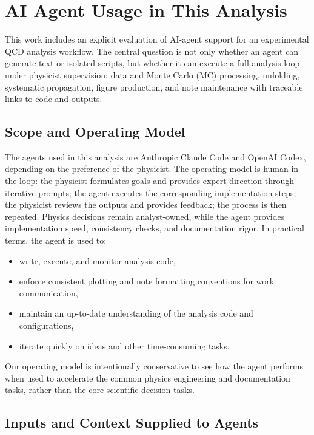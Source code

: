 \section{AI Agent Usage in This Analysis}
\label{sec:ai_agent}

This work includes an explicit evaluation of AI-agent support for an experimental QCD analysis workflow. The central question is not only whether an agent can generate text or isolated scripts, but whether it can execute a full
analysis loop under physicist supervision: data and Monte Carlo (MC) processing, unfolding, systematic propagation, figure production, and note maintenance with traceable links to code and outputs.

\subsection{Scope and Operating Model}

The agents used in this analysis are Anthropic Claude Code and OpenAI Codex, depending on the preference of the physicist. The operating model is human-in-the-loop: the physicist formulates goals and provides expert direction through iterative prompts; the agent executes the corresponding implementation steps; the physicist reviews the outputs and provides feedback; the process is then repeated. Physics decisions remain analyst-owned, while the agent provides implementation speed, consistency checks, and documentation rigor. In practical terms, the agent is used to:
\begin{itemize}
\item write, execute, and monitor analysis code,
\item enforce consistent plotting and note formatting conventions for work communication,
\item maintain an up-to-date understanding of the analysis code and configurations,
\item iterate quickly on ideas and other time-consuming tasks.
\end{itemize}

\noindent Our operating model is intentionally conservative to see how the agent performs when used to accelerate the common physics engineering and documentation tasks, rather than the core scientific decision tasks.

\subsection{Inputs and Context Supplied to Agents}
\label{sec:agent_inputs}


